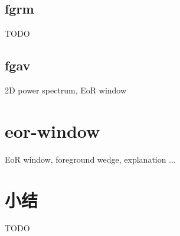 \subsection{\acl*{fgrm}}  %

TODO

\subsection{\acl*{fgav}}  %

2D power spectrum, EoR window


\section{\acl*{eor-window}}  %
\label{sec:eor-window}

EoR window, foreground wedge, explanation ...


\section{小结}

TODO


